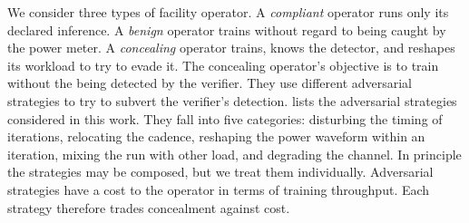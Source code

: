 \documentclass{article}
\begin{document}
We consider three types of facility operator. A \emph{compliant} operator runs only its declared inference. A \emph{benign} operator trains without regard to being caught by the power meter.  A \emph{concealing} operator trains, knows the detector, and reshapes its workload to try to evade it. The concealing operator's objective is to train
without the being detected by the verifier. They use different adversarial strategies to try to subvert the verifier's detection.  lists the adversarial strategies considered in this work. They
fall into five categories: disturbing the timing of iterations, relocating the
cadence, reshaping the power waveform within an iteration, mixing the run with
other load, and degrading the channel. In principle the strategies may be composed, but we treat them individually. Adversarial strategies have a cost to the operator in terms of training throughput. Each strategy therefore trades concealment against cost. 
\end{document}

